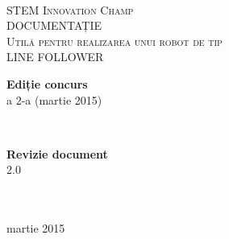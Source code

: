 \documentclass[openany, a4, 11pt]{book}
\begin{document}
\begin{titlepage}

\begin{center}
 
\begin{figure}[htb]
\end{figure}
\noindent{\rule{8cm}{0.4pt}}\\[0.3cm]
\textsc{\Large STEM Innovation Champ}\\[5.0cm]

{\Huge DOCUMENTAȚIE}\\[0.4cm]
\textsc{\Large Utilă pentru realizarea unui robot de tip\\ LINE FOLLOWER}\\[5.0cm]

\begin{minipage}{0.5\textwidth}
\begin{flushleft}
\large{\textbf{Ediție concurs}}\\
\large{a 2-a (martie 2015)}
\end{flushleft}
\end{minipage}
~
\begin{minipage}{0.4\textwidth}
\begin{flushright}
\large{\textbf{Revizie document}} \\
2.0\\
\end{flushright}
\end{minipage}\\[3.0cm]

\noindent{\rule{8cm}{0.4pt}}\\[0.3cm] 
{\large martie 2015}\\[1cm] 

\end{center}

\end{titlepage}
\restoregeometry

\thispagestyle{empty}
\section*{}
\end{document}
